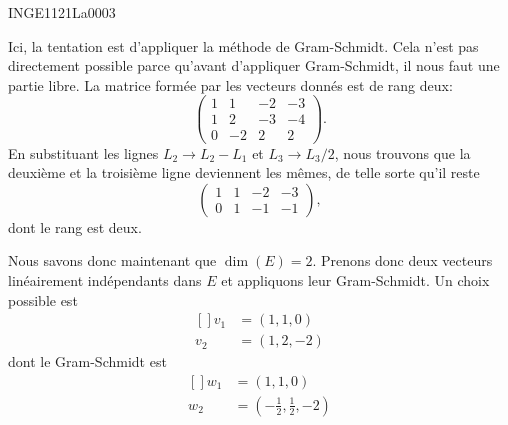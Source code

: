 

\begin{corrige}{INGE1121La0003}

	Ici, la tentation est d'appliquer la méthode de Gram-Schmidt. Cela n'est pas directement possible parce qu'avant d'appliquer Gram-Schmidt, il nous faut une partie libre. La matrice formée par les vecteurs donnés est de rang deux:
	\begin{equation}
		\begin{pmatrix}
			 1	&	1	&	-2	&	-3	\\
			 1	&	2	&	-3	&	-4	\\ 
			 0	&	-2	&	2	&	2	 
		\end{pmatrix}.
	\end{equation}
	En substituant les lignes $ L_2\to L_2-L_1$ et $L_3\to L_3/2$, nous trouvons que la deuxième et la troisième ligne deviennent les mêmes, de telle sorte qu'il reste
	\begin{equation}
		\begin{pmatrix}
			 1	&	1	&	-2	&	-3	\\
			 0	&	1	&	-1	&	-1	
		\end{pmatrix},
	\end{equation}
	dont le rang est deux.

	Nous savons donc maintenant que $\dim(E)=2$. Prenons donc deux vecteurs linéairement indépendants dans $E$ et appliquons leur Gram-Schmidt. Un choix possible est
	\begin{equation}
		\begin{aligned}[]
			v_1&=(1,1,0)\\
			v_2&=(1,2,-2)
		\end{aligned}
	\end{equation}
	dont le Gram-Schmidt est
	\begin{equation}
		\begin{aligned}[]
			w_1&=(1,1,0)\\
			w_2&=(-\frac{1}{ 2 },\frac{1}{ 2 },-2)
		\end{aligned}
	\end{equation}

\end{corrige}
